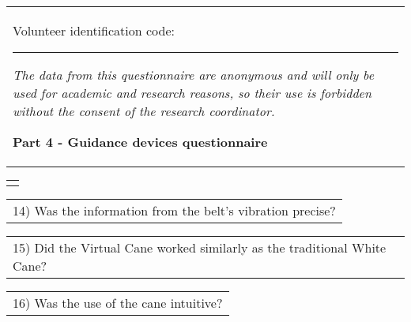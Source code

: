 \begin{table}[!thb]
    \begin{tabular}{m{1\linewidth}}

        {\color{gray}

        Volunteer identification code: \rule{1in}{.2mm}
        
        \textit{The data from this questionnaire are anonymous and will only be used for academic and research reasons, so their use is forbidden without the consent of the research coordinator.}
        }
        
        \begin{center}
        \textbf{Part 4 - Guidance devices questionnaire}
        \end{center}
        
    \end{tabular}
%
    \begin{tabular}{>{\centering\arraybackslash}m{1\linewidth}}
        {\large TEST 3 - VIRTUAL CANE}
    \end{tabular}


    \begin{tabular}{m{1\linewidth}}
        \vspace{2ex}
        14)	Was the information from the belt's vibration precise?
    \end{tabular}

    
    

    \begin{tabular}{m{1\linewidth}}
        \vspace{2ex}
        15) Did the Virtual Cane worked similarly as the traditional White Cane?
    \end{tabular}

    
    

    \begin{tabular}{m{1\linewidth}}
        \vspace{2ex}
        16)	Was the use of the cane intuitive?
    \end{tabular}

    
    


\end{table}

